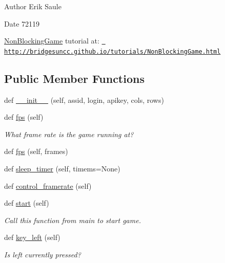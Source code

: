 \begin{DoxyAuthor}{Author}
Erik Saule 
\end{DoxyAuthor}
\begin{DoxyDate}{Date}
72119
\end{DoxyDate}
\mbox{\hyperlink{classbridges_1_1non__blocking__game_1_1_non_blocking_game}{Non\+Blocking\+Game}} tutorial at\+: \href{http://bridgesuncc.github.io/tutorials/NonBlockingGame.html}{\texttt{ http\+://bridgesuncc.\+github.\+io/tutorials/\+Non\+Blocking\+Game.\+html}} \subsection*{Public Member Functions}
\begin{DoxyCompactItemize}
\item 
def \mbox{\hyperlink{classbridges_1_1non__blocking__game_1_1_non_blocking_game_a19362773d256eec033f04cfd00b7160c}{\+\_\+\+\_\+init\+\_\+\+\_\+}} (self, assid, login, apikey, cols, rows)
\item 
def \mbox{\hyperlink{classbridges_1_1non__blocking__game_1_1_non_blocking_game_a5763c5a20f130943cec948a9f42803a0}{fps}} (self)
\begin{DoxyCompactList}\small\item\em What frame rate is the game running at? \end{DoxyCompactList}\item 
def \mbox{\hyperlink{classbridges_1_1non__blocking__game_1_1_non_blocking_game_a46b4b4a25c7c7ffc78126a7b693b7ceb}{fps}} (self, frames)
\item 
def \mbox{\hyperlink{classbridges_1_1non__blocking__game_1_1_non_blocking_game_a2e4dca6a290c65472200e69012e01d16}{sleep\+\_\+timer}} (self, timems=None)
\item 
def \mbox{\hyperlink{classbridges_1_1non__blocking__game_1_1_non_blocking_game_ad751eeccbf14adc09f9c11acce3757c9}{control\+\_\+framerate}} (self)
\item 
def \mbox{\hyperlink{classbridges_1_1non__blocking__game_1_1_non_blocking_game_ad6e23c265e1b710114459f0b666d25cb}{start}} (self)
\begin{DoxyCompactList}\small\item\em Call this function from main to start game. \end{DoxyCompactList}\item 
def \mbox{\hyperlink{classbridges_1_1non__blocking__game_1_1_non_blocking_game_a87490ef28d161f22e753aab5d3e67e46}{key\+\_\+left}} (self)
\begin{DoxyCompactList}\small\item\em Is left currently pressed? \end{DoxyCompactList}\item 

\end{DoxyCompactItemize}
